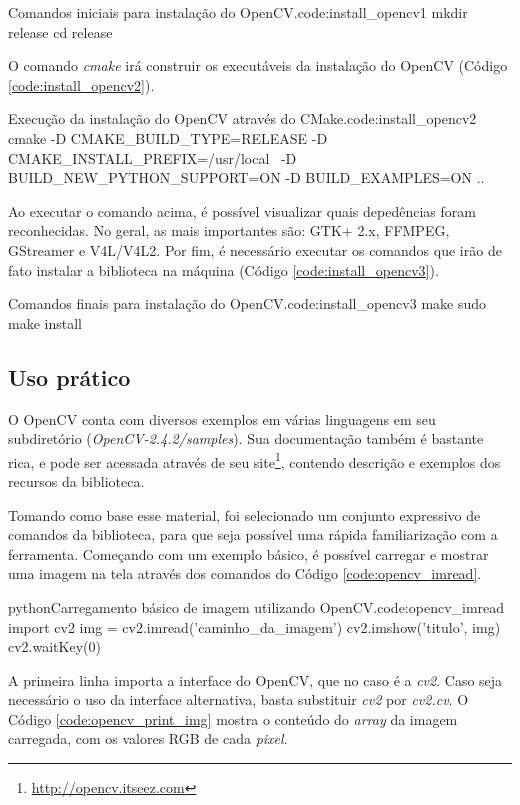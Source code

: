\begin{terminal}{Comandos iniciais para instalação do OpenCV.}{code:install_opencv1}
mkdir release
cd release
\end{terminal}

O comando \textit{cmake} irá construir os executáveis da instalação do OpenCV (Código \ref{code:install_opencv2}).

\begin{terminal}{Execução da instalação do OpenCV através do CMake.}{code:install_opencv2}
cmake -D CMAKE_BUILD_TYPE=RELEASE -D CMAKE_INSTALL_PREFIX=/usr/local \
  -D BUILD_NEW_PYTHON_SUPPORT=ON -D BUILD_EXAMPLES=ON ..
\end{terminal}

Ao executar o comando acima, é possível visualizar quais depedências foram reconhecidas. No geral, as mais importantes são: GTK+ 2.x, FFMPEG, GStreamer e V4L/V4L2. Por fim, é necessário executar os comandos que irão de fato instalar a biblioteca na máquina (Código \ref{code:install_opencv3}).

\begin{terminal}{Comandos finais para instalação do OpenCV.}{code:install_opencv3}
make
sudo make install
\end{terminal}

\subsection{Uso prático}

O OpenCV conta com diversos exemplos em várias linguagens em seu subdiretório (\textit{OpenCV-2.4.2/samples}). Sua documentação também é bastante rica, e pode ser acessada através de seu site\footnote{\url{http://opencv.itseez.com}}, contendo descrição e exemplos dos recursos da biblioteca.

Tomando como base esse material, foi selecionado um conjunto expressivo de comandos da biblioteca, para que seja possível uma rápida familiarização com a ferramenta. Começando com um exemplo básico, é possível carregar e mostrar uma imagem na tela através dos comandos do Código \ref{code:opencv_imread}.

\begin{code}{python}{Carregamento básico de imagem utilizando OpenCV.}{code:opencv_imread}
import cv2
img = cv2.imread('caminho_da_imagem')
cv2.imshow('titulo', img)
cv2.waitKey(0)
\end{code}

A primeira linha importa a interface do OpenCV, que no caso é a \textit{cv2}. Caso seja necessário o uso da interface alternativa, basta substituir \textit{cv2} por \textit{cv2.cv}. O Código \ref{code:opencv_print_img} mostra o conteúdo do \textit{array} da imagem carregada, com os valores RGB de cada \textit{pixel}.

